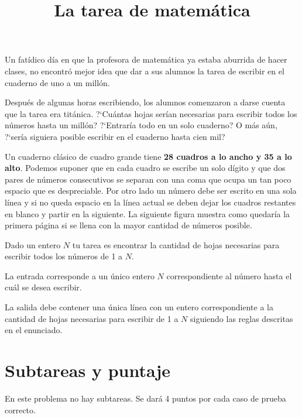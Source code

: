 \documentclass{oci}
\title{La tarea de matemática}
\begin{document}
\begin{problemDescription}
  Un fatídico día en que la profesora de matemática ya estaba aburrida de hacer
  clases, no encontró mejor idea que dar a sus alumnos la tarea de escribir en
  el cuaderno de uno a un millón.

  Después de algunas horas escribiendo, los alumnos comenzaron a darse cuenta
  que la tarea era titánica. ?`Cuántas hojas serían necesarias para escribir
  todos los números hasta un millón? ?`Entraría todo en un solo cuaderno? O más
  aún, ?`sería siguiera posible escribir en el cuaderno hasta cien mil?

  Un cuaderno clásico de cuadro grande tiene \textbf{28 cuadros a lo ancho y 35
    a lo alto}. Podemos suponer que en cada cuadro se escribe un solo dígito y
  que dos pares de números consecutivos se separan con una coma que ocupa un tan
  poco espacio que es despreciable. Por otro lado un número debe ser escrito en
  una sola línea y si no queda espacio en la línea actual se deben dejar los
  cuadros restantes en blanco y partir en la siguiente.
  La siguiente figura muestra como quedaría la primera página si se llena con la
  mayor cantidad de números posible.
  \begin{center}
  
  \end{center}
  Dado un entero $N$ tu tarea es encontrar la cantidad de hojas necesarias para
  escribir todos los números de 1 a $N$.
\end{problemDescription}

\begin{inputDescription}
  La entrada corresponde a un único entero $N$ correspondiente al número hasta
  el cuál se desea escribir.
\end{inputDescription}

\begin{outputDescription}
  La salida debe contener una única línea con un entero correspondiente a la
  cantidad de hojas necesarias para escribir de 1 a $N$ siguiendo las reglas
  descritas en el enunciado.
\end{outputDescription}

\section*{Subtareas y puntaje}
En este problema no hay subtareas. Se dará 4 puntos por cada caso de prueba
correcto.

\begin{sampleDescription}
    
\end{sampleDescription}
\end{document}
